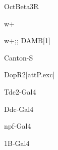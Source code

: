 \documentclass[17pt]{extarticle}
\begin{document}
\vspace*{\fill}\begin{large}
OctBeta3R \\[0.5em]
\end{large}
\footnotesize
\vspace*{\fill}
\newpage{}
\vspace*{\fill}\begin{large}
w+ \\[0.5em]
\end{large}
\footnotesize
\vspace*{\fill}
\newpage{}
\vspace*{\fill}\begin{normalsize}
w+;; DAMB[1] \\[0.5em]
\end{normalsize}
\footnotesize
\vspace*{\fill}
\newpage{}
\vspace*{\fill}\begin{large}
Canton-S \\[0.5em]
\end{large}
\footnotesize
\vspace*{\fill}
\newpage{}
\vspace*{\fill}\begin{normalsize}
DopR2[attP.exc] \\[0.5em]
\end{normalsize}
\footnotesize
\vspace*{\fill}
\newpage{}
\vspace*{\fill}\begin{large}
Tdc2-Gal4 \\[0.5em]
\end{large}
\footnotesize
\vspace*{\fill}
\newpage{}
\vspace*{\fill}\begin{large}
Ddc-Gal4 \\[0.5em]
\end{large}
\footnotesize
\vspace*{\fill}
\newpage{}
\vspace*{\fill}\begin{large}
npf-Gal4 \\[0.5em]
\end{large}
\footnotesize
\vspace*{\fill}
\newpage{}
\vspace*{\fill}\begin{large}
1B-Gal4 \\[0.5em]
\end{large}
\end{document}
